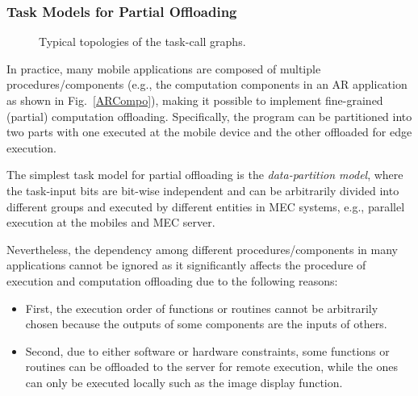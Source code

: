 \documentclass[journal]{IEEEtran}
\begin{document}
%
\subsubsection{\textbf{Task Models for Partial Offloading}}
\begin{figure*}[!t]
\centering
{}
\caption{Typical topologies of the task-call graphs.}
\label{CGtopology}
\end{figure*}

In practice, many mobile applications are composed of multiple procedures/components (e.g., the computation components in an AR application as shown in Fig.~\ref{ARCompo}),  making it possible to implement fine-grained (partial)  computation offloading. Specifically, the program can be partitioned into two parts with one executed at the mobile device and the other  offloaded for edge execution.

The simplest task model for partial offloading is the \emph{data-partition model}, where the task-input bits are bit-wise  independent and can be arbitrarily divided into different groups and executed by different entities in MEC systems, e.g., parallel execution at the mobiles and MEC server.

Nevertheless, the dependency among different procedures/components in many applications cannot be ignored as  it  significantly affects the procedure  of execution and computation offloading due to the following reasons:
\begin{itemize}
\item First, the execution order of functions or routines  cannot be arbitrarily chosen because the outputs of some components are the inputs of others.

\item Second, due to either software or hardware constraints, some functions or routines  can be offloaded to the server for remote execution, while the  ones can only be executed locally such as the image display function.
\end{itemize}
\end{document}
